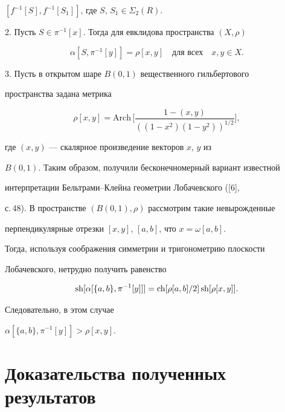 $[f ^{-1}[S],f ^{-1}[S_{1}]]$, где $S,\, S_{1} \in \Sigma_{2}(R)$.





2. Пусть $S \in \pi^{-1}[x]$. Тогда для евклидова пространства $(X,\rho)$


$$


\alpha [S,\pi^{-1}[y]] = \rho [x,y]\quad\text{для всех}\quad x,y \in X.


$$





3. Пусть в открытом шаре $B(0,1)$ вещественного гильбертового


пространства задана метрика


$$


\rho[x,y]= \mathrm{Arch}\,\bigg[\frac{1- (x,y)}{((1 -x^{2})(1 - y^{2}))^{


1/2}}\bigg],


$$


где $(x,y)$ --- скалярное произведение векторов $x$, $y$ из


$B(0,1)$. Таким образом, получили бесконечномерный вариант известной


интерпретации Бельтрами--Клейна геометрии Лобачевского ([6],


с.\,48). В пространстве $(B(0,1),\rho)$ рассмотрим такие невырожденные


перпендикулярные отрезки $[x,y]$, $[a,b]$, что $x = \omega [a,b]$.


Тогда, используя соображения симметрии и тригонометрию плоскости


Лобачевского, нетрудно получить равенство


$$


\sh [\alpha [\{a,b\},\pi^{-1}[y]]] =


\ch [\rho [a,b]/2]\sh [\rho [x,y]].


$$


Следовательно, в этом случае


$\alpha [\{a,b\},\pi^{-1}[y]] > \rho [x,y]$.








\section{Доказательства полученных результатов}








